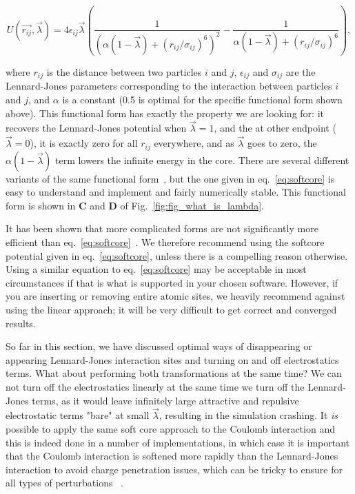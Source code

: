 \documentclass[9pt,bestpractices]{livecoms}
\begin{document}
\begin{equation}
    U(\vec{r_{ij}},\vec{\lambda}) = 4\epsilon_{ij} \vec{\lambda} \left(\frac{1}{(\alpha(1-\vec{\lambda}) + (r_{ij}/\sigma_{ij})^6)^2} -  \frac{1}{\alpha(1-\vec{\lambda}) + (r_{ij}/\sigma_{ij})^6}\right)
    \label{eq:softcore},
\end{equation}

where $r_{ij}$ is the distance between two particles $i$ and $j$, $\epsilon_{ij}$ and $\sigma_{ij}$ are the Lennard-Jones parameters corresponding to the interaction between particles $i$ and $j$, and $\alpha$ is a constant (0.5 is optimal for the specific functional form shown above). This functional form has exactly the property we are looking for: it recovers the Lennard-Jones potential when $\vec{\lambda}=1$, and the at other endpoint ($\vec{\lambda}=0$), it is exactly zero for all $r_{ij}$ everywhere, and as $\vec{\lambda}$ goes to zero, the $\alpha(1-\vec{\lambda})$ term lowers the infinite energy in the core. There are several different variants of the same functional form~\cite{zacharias1994separationshifted, beutler1994avoiding,pham2011identifying}, but the one given in eq.~\ref{eq:softcore} is easy to understand and implement and fairly numerically stable. This functional form is shown in \textbf{C} and \textbf{D} of Fig.~\ref{fig:fig_what_is_lambda}.

It has been shown that more complicated forms are not significantly more efficient than eq.~\ref{eq:softcore}~\cite{pham2012optimal}. We therefore recommend using the softcore potential given in eq.~\ref{eq:softcore}, unless there is a compelling reason otherwise. Using a similar equation to eq.~\ref{eq:softcore} may be acceptable in most circumstances if that is what is supported in your chosen software. However, if you are inserting or removing entire atomic sites, we heavily recommend against using the linear approach; it will be very difficult to get correct and converged results. 

So far in this section, we have discussed optimal ways of disappearing or appearing Lennard-Jones interaction sites and turning on and off electrostatics terms. What about performing both transformations at the same time? We can not turn off the electrostatics linearly at the same time we turn off the Lennard-Jones terms, as it would leave infinitely large attractive and repulsive electrostatic terms "bare" at small $\vec{\lambda}$, resulting in the simulation crashing. It \textit{is} possible to apply the same soft core approach to the Coulomb interaction and this is indeed done in a number of implementations, in which case it is important that the Coulomb interaction is softened more rapidly than the Lennard-Jones interaction to avoid charge penetration issues, which  can be tricky to ensure for all types of perturbations ~\cite{steinbrecher2011softcore}. 
\end{document}
